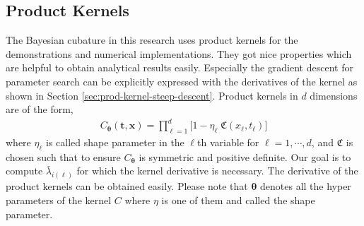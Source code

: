 \documentclass{svjour3}                     %
\newcommand{\bm}[1]{\boldsymbol{#1}}
\newcommand{\vtheta}{{\bm{\theta}}}
\newcommand{\vt}{\bm{t}}
\newcommand{\vx}{\bm{x}}
\begin{document}
\fi

































\subsection{Product Kernels}
\label{sec:product_kernel}


The Bayesian cubature in this research uses product kernels for the demonstrations and numerical implementations. They got nice properties which are helpful to obtain analytical results easily. Especially the gradient descent for parameter search can be explicitly expressed with the derivatives of the kernel as shown in Section \ref{sec:prod-kernel-steep-descent}. Product kernels in $d$ dimensions are of the form,
\begin{align}
\label{eqn:prod_kernel}
C_\vtheta(\vt, \vx) = 
\prod_{\ell=1}^d \biggl[ 1 - \eta_\ell \; \mathfrak{C}(x_\ell,t_\ell) \biggr]
\end{align}
where $\eta_\ell$ is called shape parameter in the $\ell$th variable for $\ell=1,\cdots,d$, and $\mathfrak{C}$ is chosen such that to ensure $C_{\vtheta}$ is symmetric and positive definite. Our goal is to compute $\bar{\lambda}_{i(\ell)}$ for which the kernel derivative is necessary. The derivative of the product kernels can be obtained easily. Please note that $\vtheta$ denotes all the hyper parameters of the kernel $C$ where $\eta$ is one of them and called the shape parameter.
\end{document}
